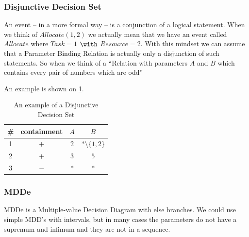 \subsubsection{Disjunctive Decision Set} 

An event -- in a more formal way -- is a conjunction of a logical statement. When we think of $\mathit{Allocate}(1,2)$ we actually mean that we have an event called $\mathit{Allocate}$ where $\mathit{Task} = 1 $ $\with$ $\mathit{Resource} = 2$.
With this mindset we can assume that a Parameter Binding Relation is actually only a disjunction of such statements.
So when we think of a ``Relation with parameters $\mathit{A}$ and $\mathit{B}$ which contains every pair of numbers
which are odd'' 

An example is shown on \cref{tab:cep:dds}.

\begin{table}
	\centering
	\caption{An example of a Disjunctive Decision Set}		
	\label{tab:cep:dds}
	\begin{tabular}{cccc}
		\toprule
		\# & containment & $A$ & $B$ \\
		\midrule
		1 & $+$ & $2$ & $\ast\setminus\{1,2\}$ \\
		2 & $+$ & $3$ & $5$ \\
		3 & $-$ & $\ast$ & $\ast$ \\
		\bottomrule
	\end{tabular}
\end{table}


\subsubsection{MDDe}

MDDe is a Multiple-value Decision Diagram with else branches. We could use simple MDD's with intervals, but in many cases the parameters do not have a supremum and infimum and they are not in a sequence.




